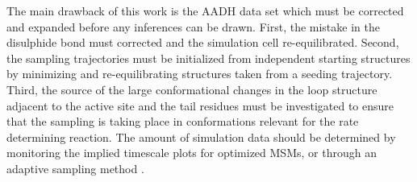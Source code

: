 The main drawback of this work is the AADH data set which must be corrected and expanded before any inferences can be drawn. First, the mistake in the disulphide bond must corrected and the simulation cell re-equilibrated. Second, the sampling trajectories must be initialized from independent starting structures by minimizing and re-equilibrating structures taken from a seeding trajectory. Third, the source of the large conformational changes in the loop structure adjacent to the active site and the tail residues must be investigated to ensure that the sampling is taking place in  conformations relevant for the rate determining reaction. The amount of simulation data should be determined by monitoring the implied timescale plots for optimized MSMs, or through an adaptive sampling method \cite{doerrOntheFlyLearningSampling2014}. 